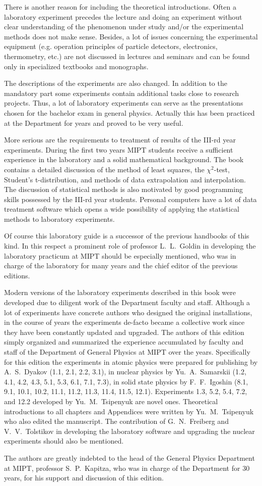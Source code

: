There is another reason for including the theoretical introductions. Often a laboratory experiment precedes the lecture and doing an experiment without clear understanding of the phenomenon under study and/or the experimental methods does not make sense. Besides, a lot of issues concerning the experimental equipment (e.g. operation principles of particle detectors, electronics, thermometry, etc.) are not discussed in lectures and seminars and can be found only in specialized textbooks and monographs.

The descriptions of the experiments are also changed. In addition to the mandatory part some experiments contain additional tasks close to research projects. Thus, a lot of laboratory experiments can serve as the presentations chosen for the bachelor exam in general physics. Actually this has been practiced at the Department for years and proved to be very useful. 

More serious are the requirements to treatment of results of the III-rd year experiments. During the first two years MIPT students receive a sufficient experience in the laboratory and a solid mathematical background. The book contains a detailed discussion of the method of least squares, the $\chi^2$-test, Student's t-distribution, and methods of data extrapolation and interpolation. The discussion of statistical methods is also motivated by good programming skills possessed by the III-rd year students. Personal computers have a lot of data treatment software which opens a wide possibility of applying the statistical methods to laboratory experiments.   

Of course this laboratory guide is a successor of the previous handbooks of this kind. In this respect a prominent role of professor L.~L.~Goldin in developing the laboratory practicum at MIPT should be especially mentioned, who was in charge of the laboratory for many years and the chief editor of the previous editions.

Modern versions of the laboratory experiments described in this book were developed due to diligent work of the Department faculty and staff. Although a lot of experiments have concrete authors who designed the original installations, in the course of years the experiments de-facto became a collective work since they have been constantly updated and upgraded. The authors of this edition simply organized and summarized the experience accumulated by faculty and staff of the Department of General Physics at MIPT over the years. Specifically for this edition the experiments in atomic physics were prepared for publishing by A.~S.~Dyakov (1.1, 2.1, 2.2, 3.1), in nuclear physics by Yu.~A.~Samarskii (1.2, 4.1, 4.2, 4.3, 5.1, 5.3, 6.1, 7.1, 7.3), in solid state physics by F.~F.~Igoshin (8.1, 9.1, 10.1, 10.2, 11.1, 11.2, 11.3, 11.4, 11.5, 12.1). Experiments 1.3, 5.2, 5.4, 7.2, and 12.2 developed by Yu.~M.~Tsipenyuk are novel ones. Theoretical introductions to all chapters and Appendices were written by Yu.~M.~Tsipenyuk who also edited the manuscript. The contribution of G.~N.~Freiberg and V.~V.~Tolstikov in developing the laboratory software and upgrading the nuclear experiments should also be mentioned.

The authors are greatly indebted to the head of the General Physics Department at MIPT, professor S.~P.~Kapitza, who was in charge of the Department for 30 years, for his support and discussion of this edition.

